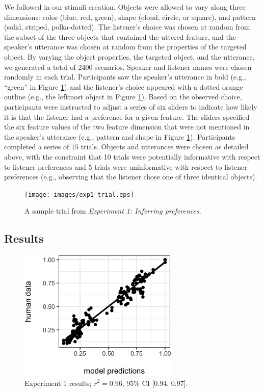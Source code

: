 \documentclass[10pt,a4paper]{article}
\begin{document}
We followed  in our stimuli creation. Objects were allowed to vary along three dimensions: color (blue, red, green), shape (cloud, circle, or square), and pattern (solid, striped, polka-dotted). The listener's choice was chosen at random from the subset of the three objects that contained the uttered feature, and the speaker's utterance was chosen at random from the properties of the targeted object. By varying the object properties, the targeted object, and the utterance, we generated a total of 2400 scenarios. Speaker and listener names were chosen randomly in each trial. Participants saw the speaker's utterance in bold (e.g., ``green'' in Figure \ref{exp1-trial}) and the listener's choice appeared with a dotted orange outline (e.g., the leftmost object in Figure \ref{exp1-trial}). Based on the observed choice, participants were instructed to adjust a series of six sliders to indicate how likely it is that the listener had a preference for a given feature. The sliders specified the six feature values of the two feature dimension that were not mentioned in the speaker's utterance (e.g., pattern and shape in Figure \ref{exp1-trial}). Participants completed a series of $15$ trials. Objects and utterances were chosen as detailed above, with the constraint that 10 trials were potentially informative with respect to listener preferences and 5 trials were uninformative with respect to listener preferences (e.g., observing that the listener chose one of three identical objects). 

\begin{figure}[ht!]
	\centering
	\texttt{[image: images/exp1-trial.eps]}
	\caption{A sample trial from \emph{Experiment 1: Inferring preferences}.}\label{exp1-trial}
\end{figure}

\subsection{Results}

\begin{figure}[ht]
	\centering
	\includegraphics[width=3in]{images/X4-scatter-CogSci.eps}
	\caption{Experiment 1 results; $r^{2}=0.96$, 95\% CI [0.94, 0.97].}\label{exp1-results}
\end{figure}
\end{document}
